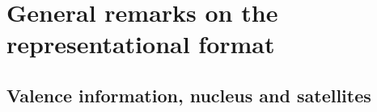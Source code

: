 

















\section{General remarks on the representational format}


\subsection{Valence information, nucleus and satellites}

